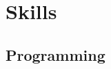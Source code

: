 \documentclass[a4paper]{deedy-resume} %
\begin{document}
\begin{minipage}[t]{0.33\textwidth}
\sectionspace %











\section{Skills}

\subsection{Programming}


\end{minipage}
\end{document}
